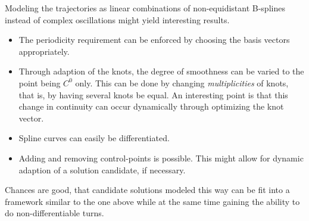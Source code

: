 Modeling the trajectories as linear combinations of non-equidistant B-splines instead of complex oscillations might yield interesting results. %
\begin{itemize}
	\item The periodicity requirement can be enforced by choosing the basis vectors appropriately.
	\item Through adaption of the knots, the degree of smoothness can be varied to the point being $C^0$ only.
		This can be done by changing \emph{multiplicities} of knots, that is, by having several knots be equal.
		An interesting point is that this change in continuity can occur dynamically through optimizing the knot vector.
	\item Spline curves can easily be differentiated.
	\item Adding and removing control-points is possible.
		This might allow for dynamic adaption of a solution candidate, if necessary.
\end{itemize}
Chances are good, that candidate solutions modeled this way can be fit into a framework similar to the one above while at the same time gaining the ability to do non-differentiable turns.

